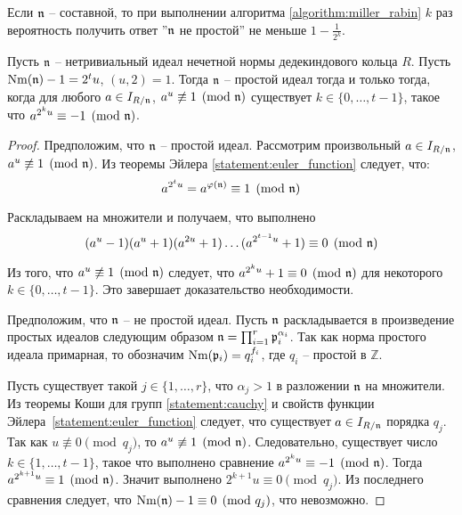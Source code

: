\documentclass[_00_dissertation.tex]{subfiles}
\begin{document}
\begin{remark}
    Если $\mathfrak{n}$ -- составной, то при выполнении алгоритма \ref{algorithm:miller_rabin} $k$ раз вероятность получить ответ ''$\mathfrak{n}$ не простой'' не меньше $1 - \frac{1}{2^k}$.
\end{remark}

\begin{theorem}\label{theorem:miller_criteria}
    Пусть $\mathfrak{n}$ -- нетривиальный идеал нечетной нормы дедекиндового кольца $R$.
    Пусть $\textrm{Nm}(\mathfrak{n}) - 1 = 2^t u$, $(u, 2) = 1$.
    Тогда $\mathfrak{n}$ -- простой идеал тогда и только тогда, когда для любого $a \in I_{R/\mathfrak{n}}$, $a^u \not\equiv 1 \pmod{\mathfrak{n}}$ существует $k\in \{0, \dots, t-1\}$, такое что $a^{2^{k}u} \equiv -1 \pmod{\mathfrak{n}}$.
\end{theorem}
\begin{proof}
    Предположим, что $\mathfrak{n}$ -- простой идеал.
    Рассмотрим произвольный $a \in I_{R/\mathfrak{n}}$, $a^u \not\equiv 1 \pmod{\mathfrak{n}}$.
    Из теоремы Эйлера \ref{statement:euler_function} следует, что:
    \begin{equation*}
        a^{2^{t} u} = a^{\varphi(\mathfrak{n})} \equiv 1 \pmod{\mathfrak{n}}
    \end{equation*}

    Раскладываем на множители и получаем, что выполнено
    \begin{equation*}
        (a^{u} - 1)(a^{u} + 1)(a^{2u} + 1)\dots(a^{2^{t-1}u} + 1) \equiv 0 \pmod{\mathfrak{n}}
    \end{equation*}

    Из того, что $a^{u} \not\equiv 1 \pmod{\mathfrak{n}}$ следует, что $a^{2^{k}u} + 1 \equiv 0 \pmod{\mathfrak{n}}$ для некоторого $k\in \{0, \dots, t-1\}$.
    Это завершает доказательство необходимости.

    Предположим, что $\mathfrak{n}$ -- не простой идеал.
    Пусть $\mathfrak{n}$ раскладывается в произведение простых идеалов следующим образом $\mathfrak{n} = \prod_{i=1}^{r} \mathfrak{p}_i^{\alpha_i}$.
    Так как норма простого идеала примарная, то обозначим $\textrm{Nm}(\mathfrak{p}_i) = q_i^{f_i}$, где $q_i$ -- простой в $\mathbb{Z}$.

    Пусть существует такой $j \in \{1, \dots, r\}$, что $\alpha_j > 1$ в разложении $\mathfrak{n}$ на множители.
    Из теоремы Коши для групп \ref{statement:cauchy} и свойств функции Эйлера~\ref{statement:euler_function} следует, что существует $a \in I_{R/\mathfrak{n}}$ порядка $q_j$.
    Так как $u \not\equiv 0 \pmod{q_j}$, то $a^u \not\equiv 1 \pmod{\mathfrak{n}}$.
    Следовательно, существует число $k \in \{1, \dots, t-1\}$, такое что выполнено сравнение $a^{2^{k}u} \equiv -1 \pmod{\mathfrak{n}}$.
    Тогда $a^{2^{k+1}u} \equiv 1 \pmod{\mathfrak{n}}$.
    Значит выполнено $2^{k+1}u \equiv 0 \pmod{q_j}$.
    Из последнего сравнения следует, что $\textrm{Nm}(\mathfrak{n}) - 1 \equiv 0 \pmod{q_j}$, что невозможно.
    

\end{proof}
\end{document}
